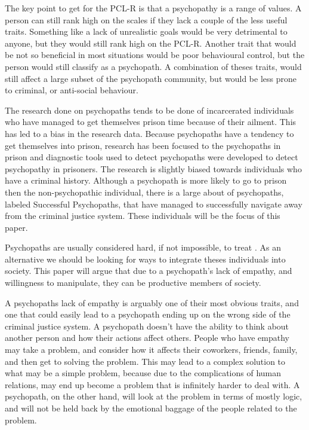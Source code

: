 \documentclass[12pt,jou]{apa}
\begin{document}
The key point to get for the PCL-R is that a psychopathy is a range of values.
A person can still rank high on the scales if they lack a couple of the less
useful traits. Something like a lack of unrealistic goals would be very
detrimental to anyone, but they would still rank high on the PCL-R. Another
trait that would be not so beneficial in most situations would be poor
behavioural control, but the person would still classify as a psychopath. A
combination of theses traits, would still affect a large subset of the
psychopath community, but would be less prone to criminal, or
anti-social behaviour. 

The research done on psychopaths tends to be done of incarcerated individuals
who have managed to get themselves prison time because of their ailment. This
has led to a bias in the research data. Because psychopaths have a tendency to
get themselves into prison, research has been focused to the psychopaths in
prison and diagnostic tools used to detect psychopaths were developed to detect
psychopathy in prisoners. The research is slightly biased towards individuals
who have a criminal history. Although a psychopath is more likely to go to
prison then the non-psychopathic individual, there is a large about of
psychopaths, labeled Successful Psychopaths, that have managed to successfully
navigate away from the criminal justice system. These individuals will be the
focus of this paper. 

Psychopaths are usually considered hard, if not impossible, to treat
\cite{crimpsych}. As an alternative we should be looking for ways to integrate
theses individuals into society. This paper will argue that due to a psychopath's
lack of empathy, and willingness to manipulate, they can be
productive members of society.

A psychopaths lack of empathy is arguably one of their most obvious traits,
and one that could easily lead to a psychopath ending up on the wrong side of
the criminal justice system. A psychopath doesn't have the ability to think
about another person and how their actions affect others. People who have
empathy may take a problem, and consider how it affects their coworkers, friends,
family, and then get to solving the problem. This may lead to a complex solution
to what may be a simple problem, because due to the complications of human
relations, may end up become a problem that is infinitely harder to deal with. A
psychopath, on the other hand, will look at the problem in terms of mostly
logic, and will not be held back by the emotional baggage of the people related
to the problem. %
\end{document}
